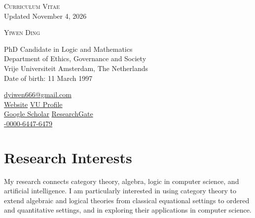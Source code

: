 \documentclass[11pt,a4paper]{article}
\begin{document}
\begin{center}
{\Large\scshape Curriculum Vitae}\\[5pt]
{\footnotesize Updated November 4, 2026}
\end{center}
\vspace{0pt}
{\LARGE\scshape Yiwen Ding}\par
\vspace{5pt}
\begin{minipage}[t]{0.54\textwidth}
PhD Candidate in Logic and Mathematics\\
Department of Ethics, Governance and Society\\
Vrije Universiteit Amsterdam, The Netherlands\\
Date of birth: 11 March 1997
\end{minipage}\hfill
\begin{minipage}[t]{0.44\textwidth}\raggedleft\small
\href{mailto:dyiwen666@gmail.com}{\faEnvelope\enspace dyiwen666@gmail.com}\\[2pt]
\href{https://yiwending-logic.github.io/}{\faGlobe\enspace Website}\quad
\href{https://research.vu.nl/en/persons/yiwen-ding/}{\faUniversity\enspace VU Profile}\\[2pt]
\href{https://scholar.google.com/citations?user=UDOWR0MAAAAJ&hl=en}{\aiGoogleScholar\enspace Google Scholar}\quad
\href{https://www.researchgate.net/profile/Yiwen-Ding-14}{\faResearchgate\enspace ResearchGate}\\[2pt]
\href{https://orcid.org/0009-0000-6447-6479}{\faOrcid{}-0000-6447-6479}
\end{minipage}

\section*{Research Interests}
My research connects category theory, algebra, logic in computer science, and artificial intelligence. I am particularly interested in using category theory to extend algebraic and logical theories from classical equational settings to ordered and quantitative settings, and in exploring their applications in computer science.
\end{document}
